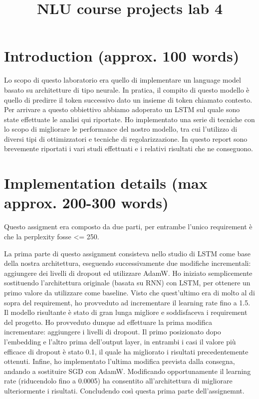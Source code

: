 \documentclass[a4paper]{article}
\title{NLU course projects lab 4}
\begin{document}
\maketitle

\section{Introduction (approx. 100 words)}
Lo scopo di questo laboratorio era quello di implementare un language model basato su architetture di tipo neurale.
In pratica, il compito di questo modello è quello di predirre il token successivo dato un insieme di token chiamato contesto.
Per arrivare a questo obbiettivo abbiamo adoperato un LSTM sul quale sono state effettuate le analisi qui riportate. Ho implementato una serie di tecniche con lo scopo di migliorare le performance del nostro modello, tra cui l’utilizzo di diversi tipi di ottimizzatori e tecniche di regolarizzazione. In questo report sono brevemente riportati i vari studi effettuati e i relativi risultati che ne conseguono.

\section{Implementation details (max approx. 200-300 words)}
Questo assigment era composto da due parti, per entrambe l’unico requirement è che la perplexity fosse <= 250.

La prima parte di questo assignment consisteva nello studio di LSTM come base della nostra architettura, eseguendo successivamente due modifiche incrementali: aggiungere dei livelli di dropout ed utilizzare AdamW.
Ho iniziato semplicemente sostituendo l’architettura originale (basata su RNN) con LSTM, per ottenere un primo valore da utilizzare come baseline. Visto che quest’ultimo era di molto al di sopra del requirement, ho provveduto ad incrementare il learning rate fino a 1.5. Il modello risultante è stato di gran lunga migliore e soddisfaceva i requirement del progetto.
Ho provveduto dunque ad effettuare la prima modifica incrementare: aggiungere i livelli di dropout. Il primo posizionato dopo l’embedding e l’altro prima dell’output layer, in entrambi i casi il valore più efficace di dropout è stato 0.1, il quale ha migliorato i risultati precedentemente ottenuti. 
Infine, ho implementato l’ultima modifica prevista dalla consegna, andando a sostituire SGD con AdamW. Modificando opportunamente il learning rate (riducendolo fino a 0.0005) ha consentito all’architettura di migliorare ulteriormente i risultati. Concludendo così questa prima parte dell’assignemnt.
\end{document}
